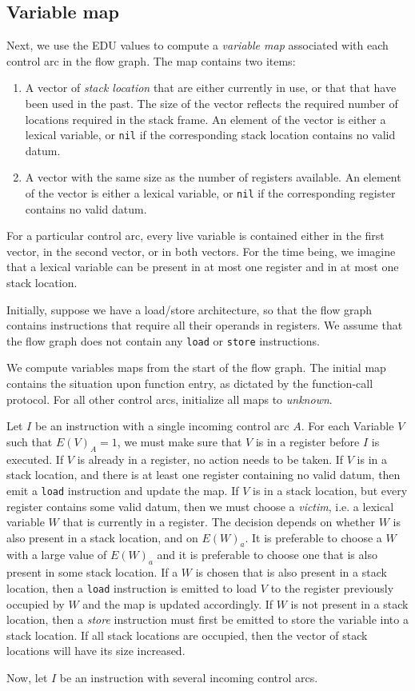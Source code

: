 \subsection{Variable map}

Next, we use the EDU values to compute a \emph{variable map}
associated with each control arc in the flow graph.  The map contains
two items:

\begin{enumerate}
\item A vector of \emph{stack location} that are either currently in
  use, or that that have been used in the past.  The size of the
  vector reflects the required number of locations required in the
  stack frame.  An element of the vector is either a lexical variable,
  or \texttt{nil} if the corresponding stack location contains no
  valid datum.
\item A vector with the same size as the number of registers
  available.  An element of the vector is either a lexical variable,
  or \texttt{nil} if the corresponding register contains no valid
  datum.
\end{enumerate}

For a particular control arc, every live variable is contained either
in the first vector, in the second vector, or in both vectors.  For
the time being, we imagine that a lexical variable can be present in
at most one register and in at most one stack location.

Initially, suppose we have a load/store architecture, so that the flow
graph contains instructions that require all their operands in
registers.  We assume that the flow graph does not contain any
\texttt{load} or \texttt{store} instructions.

We compute variables maps from the start of the flow graph.  The
initial map contains the situation upon function entry, as dictated by
the function-call protocol.  For all other control arcs, initialize
all maps to \emph{unknown}.

Let $I$ be an instruction with a single incoming control arc $A$.  For
each Variable $V$ such that $E(V)_A = 1$, we must make sure that $V$
is in a register before $I$ is executed.  If $V$ is already in a
register, no action needs to be taken.  If $V$ is in a stack location,
and there is at least one register containing no valid datum, then
emit a \texttt{load} instruction and update the map.  If $V$ is in a
stack location, but every register contains some valid datum, then we
must choose a \emph{victim}, i.e. a lexical variable $W$ that is
currently in a register.  The decision depends on whether $W$ is also
present in a stack location, and on $E(W)_a$.  It is preferable to
choose a $W$ with a large value of $E(W)_a$ and it is preferable to
choose one that is also present in some stack location.  If a $W$ is
chosen that is also present in a stack location, then a \texttt{load}
instruction is emitted to load $V$ to the register previously occupied
by $W$ and the map is updated accordingly.  If $W$ is not present in a
stack location, then a \emph{store} instruction must first be emitted
to store the variable into a stack location.  If all stack locations
are occupied, then the vector of stack locations will have its size
increased.

Now, let $I$ be an instruction with several incoming control arcs.
